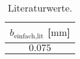 \begin{table}
    \centering
    \caption{Literaturwerte.}
    \label{tab:lit}
    \begin{tabular}{c}
        \toprule
        $b_{\text{einfach,lit}}$ [$\si{\mm}$]  \\
        \midrule
        $0.075$ \\
       \bottomrule
    \end{tabular}
\end{table}          
          
          
          
          
